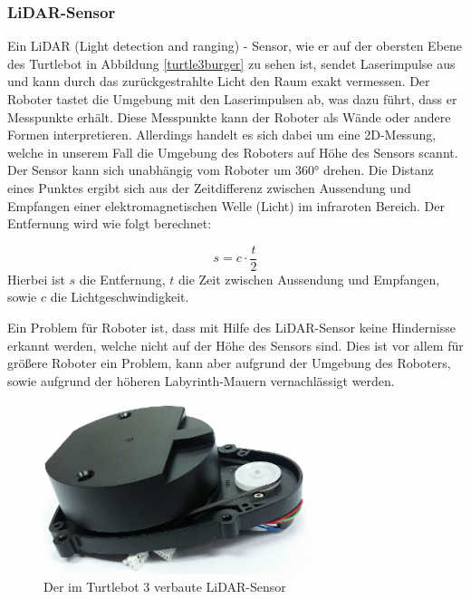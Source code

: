 {{		\subsubsection{LiDAR-Sensor}
		{
			Ein LiDAR (Light detection and ranging) - Sensor, wie er auf der obersten Ebene des Turtlebot in Abbildung \ref{turtle3burger} zu sehen ist, sendet Laserimpulse aus und kann durch das zurückgestrahlte Licht den Raum exakt vermessen. Der Roboter tastet die Umgebung mit den Laserimpulsen ab, was dazu führt, dass er Messpunkte erhält. Diese Messpunkte kann der Roboter als Wände oder andere Formen interpretieren. Allerdings handelt es sich dabei um eine 2D-Messung, welche in unserem Fall die Umgebung des Roboters auf Höhe des Sensors scannt. Der Sensor kann sich unabhängig vom Roboter um 360° drehen. 
			Die Distanz eines Punktes ergibt sich aus der Zeitdifferenz zwischen Aussendung und Empfangen einer elektromagnetischen Welle (Licht) im infraroten Bereich.
			Der Entfernung wird wie folgt berechnet:
			
			\begin{equation}
				s = c \cdot \frac{t}{2}
			\end{equation} 
			Hierbei ist $s$ die Entfernung, $t$ die Zeit zwischen Aussendung und Empfangen, sowie $c$ die Lichtgeschwindigkeit.
			
			Ein Problem für Roboter ist, dass mit Hilfe des LiDAR-Sensor keine Hindernisse erkannt werden, welche nicht auf der Höhe des Sensors sind. Dies ist vor allem für größere Roboter ein Problem, kann aber aufgrund der Umgebung des Roboters, sowie aufgrund der höheren Labyrinth-Mauern vernachlässigt werden.
			\begin{figure}[H]
				\centering
				\includegraphics[height=5cm]{Bilder/lds_small.png}
				\caption{Der im Turtlebot 3 verbaute LiDAR-Sensor}
				\label{pic:lds_small}
			\end{figure}
		}
		
}}
